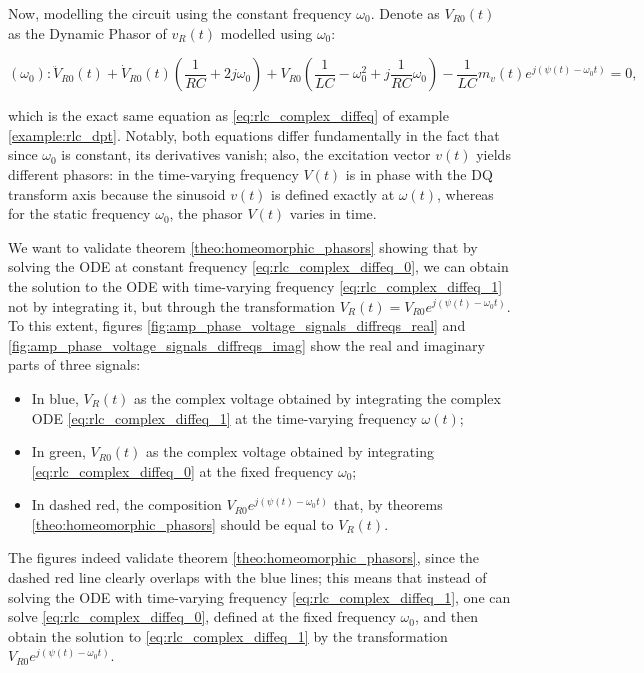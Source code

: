 \begin{example}
	Now, modelling the circuit using the constant frequency $\omega_0$. Denote as $V_{R0}(t)$ as the Dynamic Phasor of $v_R(t)$ modelled using $\omega_0$:

\begin{equation}\left(\omega_0\right): \ddot{V}_{R0}(t) + \dot{V}_{R0}(t)\left(\dfrac{1}{RC} + 2j\omega_0\right) + V_{R0}\left(\dfrac{1}{LC} - \omega_0^2 + j \dfrac{1}{RC}\omega_0\right) - \dfrac{1}{LC} m_v(t)e^{j\left(\psi(t) - \omega_0 t\right)} = 0, \label{eq:rlc_complex_diffeq_0}\end{equation}

	\noindent which is the exact same equation as \eqref{eq:rlc_complex_diffeq} of example \ref{example:rlc_dpt}. Notably, both equations differ fundamentally in the fact that since $\omega_0$ is constant, its derivatives vanish; also, the excitation vector $v(t)$ yields different phasors: in the time-varying frequency $V(t)$ is in phase with the DQ transform axis because the sinusoid $v(t)$ is defined exactly at $\omega(t)$, whereas for the static frequency $\omega_0$, the phasor $V(t)$ varies in time. 

	We want to validate theorem \ref{theo:homeomorphic_phasors} showing that by solving the ODE at constant frequency \eqref{eq:rlc_complex_diffeq_0}, we can obtain the solution to the ODE with time-varying frequency \ref{eq:rlc_complex_diffeq_1} not by integrating it, but through the transformation $V_R(t) = V_{R0}e^{j\left(\psi(t) - \omega_0 t\right)}$. To this extent, figures \ref{fig:amp_phase_voltage_signals_diffreqs_real} and \ref{fig:amp_phase_voltage_signals_diffreqs_imag} show the real and imaginary parts of three signals:

\begin{itemize}
	\item In blue, $V_R(t)$ as the complex voltage obtained by integrating the complex ODE \eqref{eq:rlc_complex_diffeq_1} at the time-varying frequency $\omega(t)$;
	\item In green, $V_{R0}(t)$ as the complex voltage obtained by integrating \eqref{eq:rlc_complex_diffeq_0} at the fixed frequency $\omega_0$;
	\item In dashed red, the composition $V_{R0}e^{j\left(\psi(t) - \omega_0 t\right)}$ that, by theorems \ref{theo:homeomorphic_phasors} should be equal to $V_{R}(t)$.
\end{itemize}

	The figures indeed validate theorem \ref{theo:homeomorphic_phasors}, since the dashed red line clearly overlaps with the blue lines; this means that instead of solving the ODE with time-varying frequency \eqref{eq:rlc_complex_diffeq_1}, one can solve \eqref{eq:rlc_complex_diffeq_0}, defined at the fixed frequency $\omega_0$, and then obtain the solution to \eqref{eq:rlc_complex_diffeq_1} by the transformation $V_{R0}e^{j\left(\psi(t) - \omega_0 t\right)}$.


\end{example}
